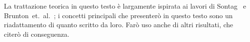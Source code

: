 La trattazione teorica in questo testo è largamente ispirata ai lavori di
Sontag~\cite{sontagMath} e Brunton~et.~al.~\cite{brunton_kutz_2019};
i concetti principali che presenterò in questo testo
sono un riadattamento di quanto scritto da loro.
Farò uso anche di altri risultati, che citerò di conseguenza.